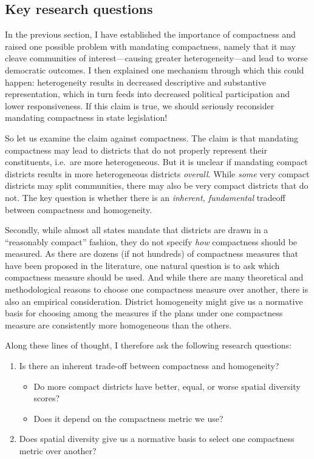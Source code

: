 \documentclass[]{article}
\providecommand{\tightlist}{%
  \setlength{\itemsep}{0pt}\setlength{\parskip}{0pt}}
\begin{document}
\hypertarget{key-research-questions}{%
\subsection{Key research questions}\label{key-research-questions}}

In the previous section, I have established the importance of
compactness and raised one possible problem with mandating compactness,
namely that it may cleave communities of interest---causing greater
heterogeneity---and lead to worse democratic outcomes. I then explained
one mechanism through which this could happen: heterogeneity results in
decreased descriptive and substantive representation, which in turn
feeds into decreased political participation and lower responsiveness.
If this claim is true, we should seriously reconsider mandating
compactness in state legislation!

So let us examine the claim against compactness. The claim is that
mandating compactness may lead to districts that do not properly
represent their constituents, i.e.~are more heterogeneous. But it is
unclear if mandating compact districts results in more heterogeneous
districts \emph{overall}. While \emph{some} very compact districts may
split communities, there may also be very compact districts that do not.
The key question is whether there is an \emph{inherent, fundamental}
tradeoff between compactness and homogeneity.

Secondly, while almost all states mandate that districts are drawn in a
``reasonably compact'' fashion, they do not specify \emph{how}
compactness should be measured. As there are dozens (if not hundreds) of
compactness measures that have been proposed in the literature, one
natural question is to ask which compactness measure should be used. And
while there are many theoretical and methodological reasons to choose
one compactness measure over another, there is also an empirical
consideration. District homogeneity might give us a normative basis for
choosing among the measures if the plans under one compactness measure
are consistently more homogeneous than the others.

Along these lines of thought, I therefore ask the following research
questions:

\begin{enumerate}
\def\labelenumi{\arabic{enumi}.}
\tightlist
\item
  Is there an inherent trade-off between compactness and homogeneity?

  \begin{itemize}
  \tightlist
  \item
    Do more compact districts have better, equal, or worse spatial
    diversity scores?
  \item
    Does it depend on the compactness metric we use?
  \end{itemize}
\item
  Does spatial diversity give us a normative basis to select one
  compactness metric over another?
\end{enumerate}
\end{document}
